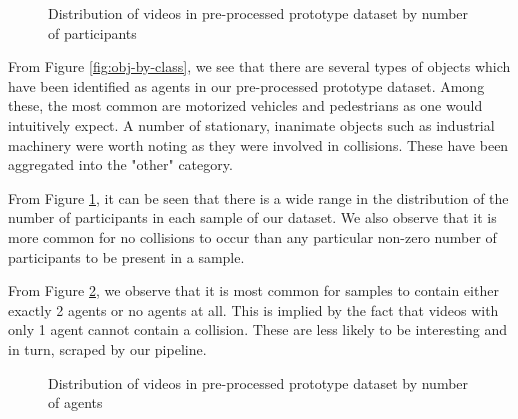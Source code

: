 \documentclass[letterpaper, 10 pt, conference]{ieeeconf}
\begin{document}
\begin{figure}[!h]
	\centering
	\caption{Distribution of videos in pre-processed prototype dataset by number of participants}
	\label{fig:vids-by-participant}
\end{figure}

From Figure \ref{fig:obj-by-class}, we see that there are several types of objects which have been identified as agents in our pre-processed prototype dataset. Among these, the most common are motorized vehicles and pedestrians as one would intuitively expect. A number of stationary, inanimate objects such as industrial machinery were worth noting as they were involved in collisions. These have been aggregated into the "other" category.

From Figure \ref{fig:vids-by-participant}, it can be seen that there is a wide range in the distribution of the number of participants in each sample of our dataset. We also observe that it is more common for no collisions to occur than any particular non-zero number of participants to be present in a sample.

From Figure \ref{fig:vids-by-agents}, we observe that it is most common for samples to contain either exactly 2 agents or no agents at all. This is implied by the fact that videos with only 1 agent cannot contain a collision. These are less likely to be interesting and in turn, scraped by our pipeline.

\begin{figure}[!h]
	\centering
	\caption{Distribution of videos in pre-processed prototype dataset by number of agents}
	\label{fig:vids-by-agents}
\end{figure}
\end{document}
